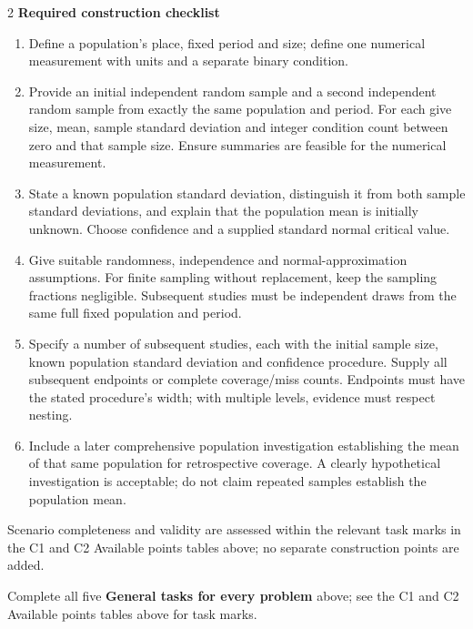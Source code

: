 \begin{multicols}{2}
\textbf{Required construction checklist}
\begin{enumerate}
\item Define a population's place, fixed period and size; define one numerical measurement with units and a separate binary condition.
\item Provide an initial independent random sample and a second independent random sample from exactly the same population and period. For each give size, mean, sample standard deviation and integer condition count between zero and that sample size. Ensure summaries are feasible for the numerical measurement.
\item State a known population standard deviation, distinguish it from both sample standard deviations, and explain that the population mean is initially unknown. Choose confidence and a supplied standard normal critical value.
\item Give suitable randomness, independence and normal-approximation assumptions. For finite sampling without replacement, keep the sampling fractions negligible. Subsequent studies must be independent draws from the same full fixed population and period.
\item Specify a number of subsequent studies, each with the initial sample size, known population standard deviation and confidence procedure. Supply all subsequent endpoints or complete coverage/miss counts. Endpoints must have the stated procedure's width; with multiple levels, evidence must respect nesting.
\item Include a later comprehensive population investigation establishing the mean of that same population for retrospective coverage. A clearly hypothetical investigation is acceptable; do not claim repeated samples establish the population mean.
\end{enumerate}

Scenario completeness and validity are assessed within the relevant task marks in the C1 and C2 Available points tables above; no separate construction points are added.

\par\smallskip
Complete all five \textbf{General tasks for every problem} above; see the C1 and C2 Available points tables above for task marks.




\end{multicols}

